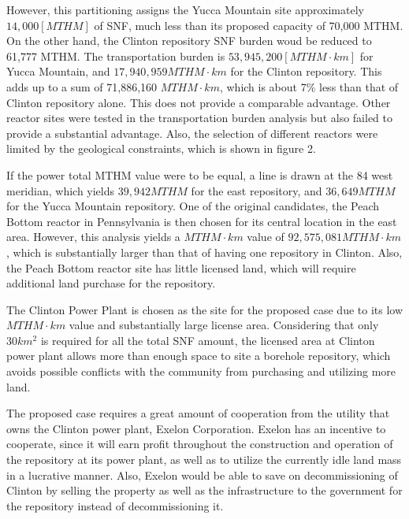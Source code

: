 However, this partitioning assigns the Yucca Mountain site approximately 
$14,000 [MTHM]$ of \gls{SNF}, much less than its proposed capacity of 70,000 MTHM. On the other hand, 
the Clinton repository \gls{SNF} burden woud be reduced to 61,777 MTHM. The transportation burden is 
$53,945,200 [MTHM\cdot km]$  
for Yucca Mountain, and $17,940,959 MTHM\cdot km$ for the Clinton repository. This 
adds up to a sum of 71,886,160 $MTHM\cdot km$, which is about 7\% less than that
of Clinton repository alone. This does not provide a comparable advantage. Other
reactor sites were tested in the transportation burden analysis but also failed
to provide a substantial advantage. Also, the selection of different reactors
were limited by the geological constraints, which is shown in figure 2.  

If the power total MTHM value were to be equal, a line is drawn at the 84 west
meridian, which yields $39,942 MTHM$ for the east repository, and $36,649 MTHM$ for
the Yucca Mountain repository. One of the original candidates, the Peach Bottom
reactor in Pennsylvania is then chosen for its central location in the east area.
However, this analysis yields a $MTHM\cdot km$ value of $92,575,081 MTHM\cdot km$,
which is substantially larger than that of having one repository in Clinton. 
Also, the Peach Bottom reactor site has little licensed land, which will require
additional land purchase for the repository. 


The Clinton Power Plant is chosen as the site for the proposed case due to its
low $MTHM\cdot km$ value and substantially large license area\cite{NRC_Clinton}.
 Considering that only
 $30km^2$ is required for all the total \gls{SNF} amount, the licensed area at Clinton
  power plant allows more than  enough space to site a borehole repository, which
   avoids possible conflicts with the community from purchasing and utilizing more
    land. 
  
  The proposed case requires a great amount of cooperation from the utility that owns
  the Clinton power plant, Exelon Corporation. 
  Exelon has an incentive to cooperate,
  since it will earn profit throughout the construction and operation of the 
  repository at its power plant, as well as to utilize the currently idle land mass
  in a lucrative manner. Also, Exelon would be able to save on decommissioning of
  Clinton by selling the property as well as the infrastructure to the government 
  for the repository instead of decommissioning it.  
  
